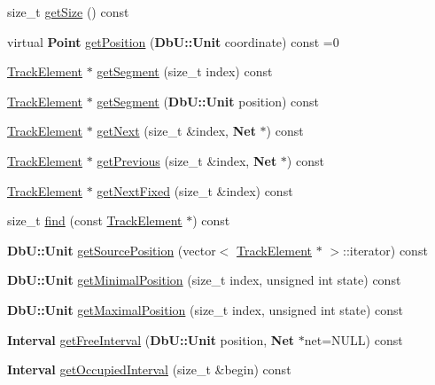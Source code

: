 \begin{DoxyCompactItemize}
\item 
size\-\_\-t \hyperlink{classKite_1_1Track_af55b3790622878d65ed5ff2bb2b3fcc4}{get\-Size} () const 
\item 
virtual {\bf Point} \hyperlink{classKite_1_1Track_a2a033f90e528d3d07aa33694dd733200}{get\-Position} ({\bf Db\-U\-::\-Unit} coordinate) const =0
\item 
\hyperlink{classKite_1_1TrackElement}{Track\-Element} $\ast$ \hyperlink{classKite_1_1Track_ac2216be50494af61a7b16d20dd8cc5dd}{get\-Segment} (size\-\_\-t index) const 
\item 
\hyperlink{classKite_1_1TrackElement}{Track\-Element} $\ast$ \hyperlink{classKite_1_1Track_aa8a5a7f28e71bce3676d4a051ab1d6c6}{get\-Segment} ({\bf Db\-U\-::\-Unit} position) const 
\item 
\hyperlink{classKite_1_1TrackElement}{Track\-Element} $\ast$ \hyperlink{classKite_1_1Track_afaad0c947c459bab3b7ef742aaa5c59f}{get\-Next} (size\-\_\-t \&index, {\bf Net} $\ast$) const 
\item 
\hyperlink{classKite_1_1TrackElement}{Track\-Element} $\ast$ \hyperlink{classKite_1_1Track_a4ebcb68fdea325b48de96a417a86d896}{get\-Previous} (size\-\_\-t \&index, {\bf Net} $\ast$) const 
\item 
\hyperlink{classKite_1_1TrackElement}{Track\-Element} $\ast$ \hyperlink{classKite_1_1Track_a13493827f36a960f3c443ff2b8ea0143}{get\-Next\-Fixed} (size\-\_\-t \&index) const 
\item 
size\-\_\-t \hyperlink{classKite_1_1Track_a92159b77cb6e17d1c81fe6b907953387}{find} (const \hyperlink{classKite_1_1TrackElement}{Track\-Element} $\ast$) const 
\item 
{\bf Db\-U\-::\-Unit} \hyperlink{classKite_1_1Track_a67e86dd6909fb12706787ea738355fdf}{get\-Source\-Position} (vector$<$ \hyperlink{classKite_1_1TrackElement}{Track\-Element} $\ast$ $>$\-::iterator) const 
\item 
{\bf Db\-U\-::\-Unit} \hyperlink{classKite_1_1Track_a00032371424630b4fd99dc1c443ee1f3}{get\-Minimal\-Position} (size\-\_\-t index, unsigned int state) const 
\item 
{\bf Db\-U\-::\-Unit} \hyperlink{classKite_1_1Track_a5c9424f73f1fafa422c8dca99c7216bd}{get\-Maximal\-Position} (size\-\_\-t index, unsigned int state) const 
\item 
{\bf Interval} \hyperlink{classKite_1_1Track_a95a9fad401e395a6b0f73e755db6ddad}{get\-Free\-Interval} ({\bf Db\-U\-::\-Unit} position, {\bf Net} $\ast$net=N\-U\-L\-L) const 
\item 
{\bf Interval} \hyperlink{classKite_1_1Track_aeb4b9c2a20ec5f82da8781b11982ae7d}{get\-Occupied\-Interval} (size\-\_\-t \&begin) const 

\end{DoxyCompactItemize}
